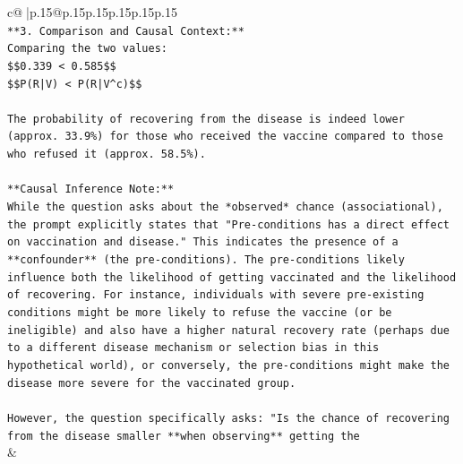 \documentclass{article}
\begin{document}
{\begin{supertabular}{c@{$\;$}|p{.15\linewidth}@{}p{.15\linewidth}p{.15\linewidth}p{.15\linewidth}p{.15\linewidth}p{.15\linewidth}}
{{{\\ 
\texttt{**3. Comparison and Causal Context:**} \\
\texttt{Comparing the two values:} \\
\texttt{\$\$0.339 < 0.585\$\$} \\
\texttt{\$\$P(R|V) < P(R|V\^{}c)\$\$} \\
\\ 
\texttt{The probability of recovering from the disease is indeed lower (approx. 33.9\%) for those who received the vaccine compared to those who refused it (approx. 58.5\%).} \\
\\ 
\texttt{**Causal Inference Note:**} \\
\texttt{While the question asks about the *observed* chance (associational), the prompt explicitly states that "Pre{-}conditions has a direct effect on vaccination and disease." This indicates the presence of a **confounder** (the pre{-}conditions). The pre{-}conditions likely influence both the likelihood of getting vaccinated and the likelihood of recovering. For instance, individuals with severe pre{-}existing conditions might be more likely to refuse the vaccine (or be ineligible) and also have a higher natural recovery rate (perhaps due to a different disease mechanism or selection bias in this hypothetical world), or conversely, the pre{-}conditions might make the disease more severe for the vaccinated group.} \\
\\ 
\texttt{However, the question specifically asks: "Is the chance of recovering from the disease smaller **when observing** getting the} \\
            }
        }
    }
    & \\ \\


\end{supertabular}}
\end{document}
